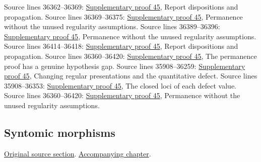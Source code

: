 \begin{AlgebraSourceRoutes}
 Source lines 36362--36369: \hyperlink{algebra_lci_notes_20260928}{Supplementary proof 45}, Report dispositions and propagation.
 Source lines 36369--36375: \hyperlink{algebra_lci_notes_20260928}{Supplementary proof 45}, Permanence without the unused regularity assumptions.
 Source lines 36389--36396: \hyperlink{algebra_lci_notes_20260928}{Supplementary proof 45}, Permanence without the unused regularity assumptions.
 Source lines 36414--36418: \hyperlink{algebra_lci_notes_20260928}{Supplementary proof 45}, Report dispositions and propagation.
 Source lines 36360--36420: \hyperlink{algebra_lci_notes_20260928}{Supplementary proof 45}, The permanence proof has a genuine hypothesis gap.
 Source lines 35908--36259: \hyperlink{algebra_lci_notes_20260928}{Supplementary proof 45}, Changing regular presentations and the quantitative defect.
 Source lines 35908--36353: \hyperlink{algebra_lci_notes_20260928}{Supplementary proof 45}, The closed loci of each defect value.
 Source lines 36360--36420: \hyperlink{algebra_lci_notes_20260928}{Supplementary proof 45}, Permanence without the unused regularity assumptions.
\end{AlgebraSourceRoutes}

\subsection{Syntomic morphisms}
\hypertarget{algebra-source-section-syntomic}{}
\noindent\href{https://github.com/stacks/stacks-project/blob/a04446e57ec1fbc252a871afcec7752fb2807b14/algebra.tex\#L36427}{Original source section}. \href{algebra.pdf\#nameddest=section-syntomic}{Accompanying chapter}.

